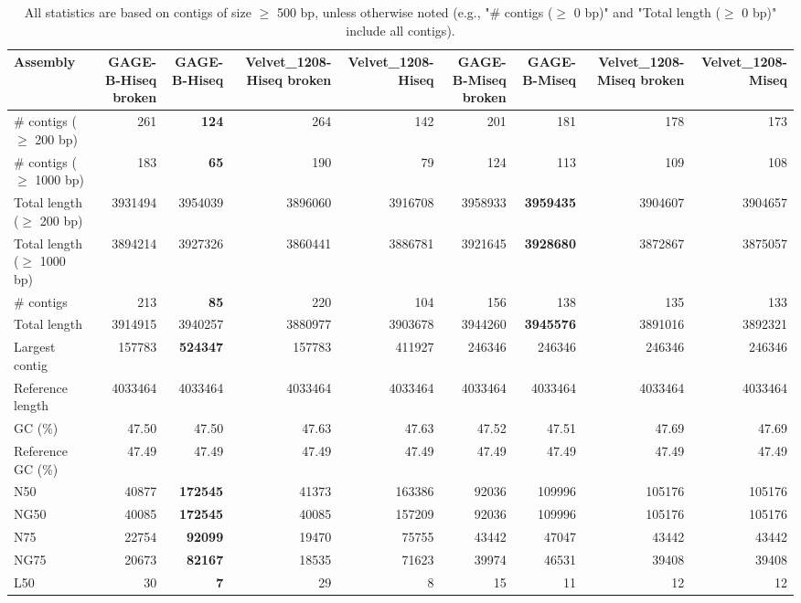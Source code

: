 \documentclass[12pt,a4paper]{article}
\begin{document}
\begin{table}[ht]
\begin{center}
\caption{All statistics are based on contigs of size $\geq$ 500 bp, unless otherwise noted (e.g., "\# contigs ($\geq$ 0 bp)" and "Total length ($\geq$ 0 bp)" include all contigs).}
\begin{tabular}{|l*{8}{|r}|}
\hline
Assembly & GAGE-B-Hiseq broken & GAGE-B-Hiseq & Velvet\_1208-Hiseq broken & Velvet\_1208-Hiseq & GAGE-B-Miseq broken & GAGE-B-Miseq & Velvet\_1208-Miseq broken & Velvet\_1208-Miseq \\ \hline
\# contigs ($\geq$ 200 bp) & 261 & {\bf 124} & 264 & 142 & 201 & 181 & 178 & 173 \\ \hline
\# contigs ($\geq$ 1000 bp) & 183 & {\bf 65} & 190 & 79 & 124 & 113 & 109 & 108 \\ \hline
Total length ($\geq$ 200 bp) & 3931494 & 3954039 & 3896060 & 3916708 & 3958933 & {\bf 3959435} & 3904607 & 3904657 \\ \hline
Total length ($\geq$ 1000 bp) & 3894214 & 3927326 & 3860441 & 3886781 & 3921645 & {\bf 3928680} & 3872867 & 3875057 \\ \hline
\# contigs & 213 & {\bf 85} & 220 & 104 & 156 & 138 & 135 & 133 \\ \hline
Total length & 3914915 & 3940257 & 3880977 & 3903678 & 3944260 & {\bf 3945576} & 3891016 & 3892321 \\ \hline
Largest contig & 157783 & {\bf 524347} & 157783 & 411927 & 246346 & 246346 & 246346 & 246346 \\ \hline
Reference length & 4033464 & 4033464 & 4033464 & 4033464 & 4033464 & 4033464 & 4033464 & 4033464 \\ \hline
GC (\%) & 47.50 & 47.50 & 47.63 & 47.63 & 47.52 & 47.51 & 47.69 & 47.69 \\ \hline
Reference GC (\%) & 47.49 & 47.49 & 47.49 & 47.49 & 47.49 & 47.49 & 47.49 & 47.49 \\ \hline
N50 & 40877 & {\bf 172545} & 41373 & 163386 & 92036 & 109996 & 105176 & 105176 \\ \hline
NG50 & 40085 & {\bf 172545} & 40085 & 157209 & 92036 & 109996 & 105176 & 105176 \\ \hline
N75 & 22754 & {\bf 92099} & 19470 & 75755 & 43442 & 47047 & 43442 & 43442 \\ \hline
NG75 & 20673 & {\bf 82167} & 18535 & 71623 & 39974 & 46531 & 39408 & 39408 \\ \hline
L50 & 30 & {\bf 7} & 29 & 8 & 15 & 11 & 12 & 12 \\ \hline

\end{tabular}
\end{center}
\end{table}
\end{document}
